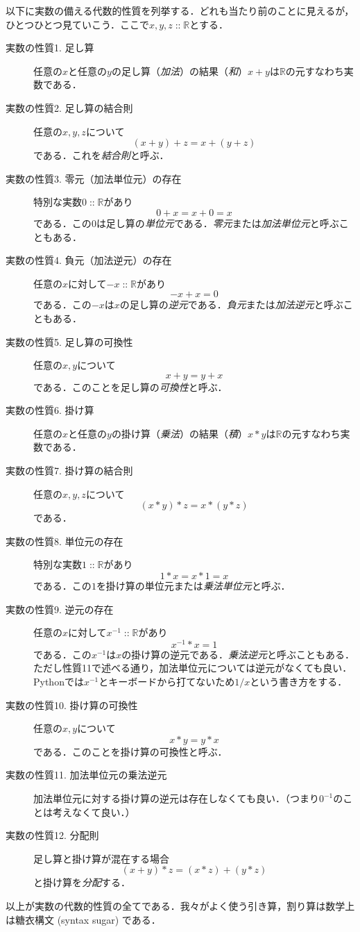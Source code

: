 \documentclass[twocolumn]{jsbook}
\newcommand{\keyword}[1]{{\emph{#1}}}
\DeclareMathOperator{\mathIn}{::}
\newcommand{\mathSpecialSet}[1]{\mathbb{#1}}
\begin{document}
以下に実数の備える代数的性質を列挙する．どれも当たり前のことに見えるが，ひとつひとつ見ていこう．ここで$x,y,z\mathIn\mathSpecialSet{R}$とする．
\begin{description}
\item[実数の性質1. 足し算] 任意の$x$と任意の$y$の足し算（\keyword{加法}）の結果（\keyword{和}）$x+y$は$\mathSpecialSet{R}$の元すなわち実数である．
\item[実数の性質2. 足し算の結合則] 任意の$x,y,z$について$$(x+y)+z=x+(y+z)$$である．これを\keyword{結合則}と呼ぶ．
\item[実数の性質3. 零元（加法単位元）の存在] 特別な実数$0\mathIn\mathSpecialSet{R}$があり$$0+x=x+0=x$$である．この$0$は足し算の\keyword{単位元}である．\keyword{零元}または\keyword{加法単位元}と呼ぶこともある．
\item[実数の性質4. 負元（加法逆元）の存在] 任意の$x$に対して$-x\mathIn\mathSpecialSet{R}$があり$$-x+x=0$$である．この$-x$は$x$の足し算の\keyword{逆元}である．\keyword{負元}または\keyword{加法逆元}と呼ぶこともある．
\item[実数の性質5. 足し算の可換性] 任意の$x,y$について$$x+y=y+x$$である．このことを足し算の\keyword{可換性}と呼ぶ．
\item[実数の性質6. 掛け算] 任意の$x$と任意の$y$の掛け算（\keyword{乗法}）の結果（\keyword{積}）$x*y$は$\mathSpecialSet{R}$の元すなわち実数である．
\item[実数の性質7. 掛け算の結合則] 任意の$x,y,z$について$$(x*y)*z=x*(y*z)$$である．
\item[実数の性質8. 単位元の存在] 特別な実数$1\mathIn\mathSpecialSet{R}$があり$$1*x=x*1=x$$である．この$1$を掛け算の単位元または\keyword{乗法単位元}と呼ぶ．
\item[実数の性質9. 逆元の存在] 任意の$x$に対して$x^{-1}\mathIn\mathSpecialSet{R}$があり$$x^{-1}*x=1$$である．この$x^{-1}$は$x$の掛け算の逆元である．\keyword{乗法逆元}と呼ぶこともある．ただし性質11で述べる通り，加法単位元については逆元がなくても良い．Pythonでは$x^{-1}$とキーボードから打てないため$1/x$という書き方をする．
\item[実数の性質10. 掛け算の可換性] 任意の$x,y$について$$x*y=y*x$$である．このことを掛け算の可換性と呼ぶ．
\item[実数の性質11. 加法単位元の乗法逆元] 加法単位元に対する掛け算の逆元は存在しなくても良い．（つまり$0^{-1}$のことは考えなくて良い．）
\item[実数の性質12. 分配則] 足し算と掛け算が混在する場合$$(x+y)*z=(x*z)+(y*z)$$と掛け算を\keyword{分配}する．
\end{description}
以上が実数の代数的性質の全てである．我々がよく使う引き算，割り算は数学上は糖衣構文 (syntax sugar) である．
\end{document}
